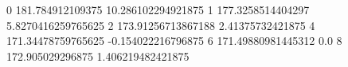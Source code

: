 0 181.784912109375 10.286102294921875
1 177.3258514404297 5.8270416259765625
2 173.91256713867188 2.41375732421875
4 171.34478759765625 -0.154022216796875
6 171.49880981445312 0.0
8 172.905029296875 1.406219482421875
